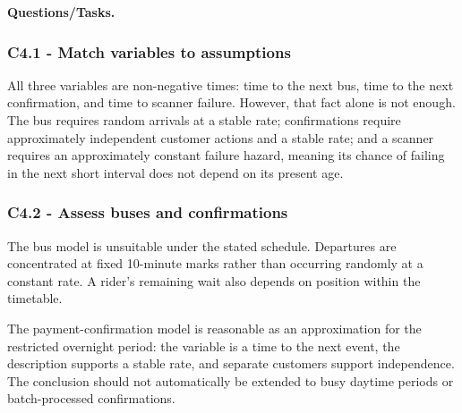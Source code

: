 \textbf{Questions/Tasks.}
\begin{enumerate}
\end{enumerate}

\subsubsection*{C4.1 - Match variables to assumptions}\label{subsec:c4-suitability-operations-a}
All three variables are non-negative times: time to the next bus, time to the
next confirmation, and time to scanner failure.  However, that fact alone is
not enough.  The bus requires random arrivals at a stable rate; confirmations
require approximately independent customer actions and a stable rate; and a
scanner requires an approximately constant failure hazard, meaning its chance
of failing in the next short interval does not depend on its present age.

\subsubsection*{C4.2 - Assess buses and confirmations}\label{subsec:c4-suitability-operations-b}
The bus model is unsuitable under the stated schedule.  Departures are
concentrated at fixed 10-minute marks rather than occurring randomly at a
constant rate.  A rider's remaining wait also depends on position within the
timetable.

The payment-confirmation model is reasonable as an approximation for the
restricted overnight period: the variable is a time to the next event, the
description supports a stable rate, and separate customers support
independence.  The conclusion should not automatically be extended to busy
daytime periods or batch-processed confirmations.

